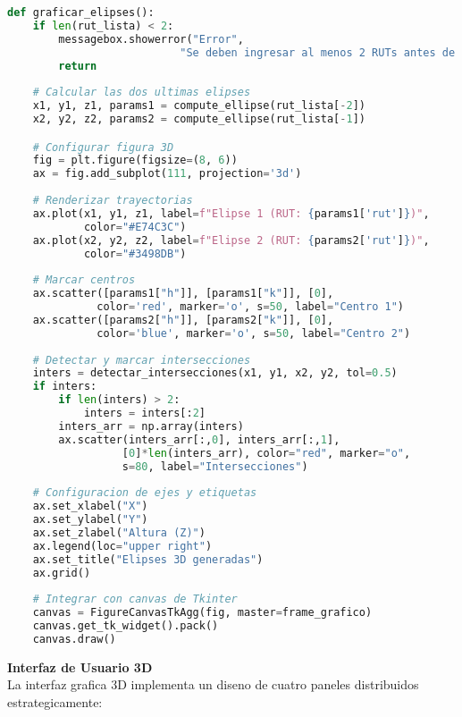 \documentclass[12pt,a4paper]{article}
\begin{document}
\begin{lstlisting}[language=Python, caption=Configuracion del renderizado 3D]
def graficar_elipses():
    if len(rut_lista) < 2:
        messagebox.showerror("Error", 
                           "Se deben ingresar al menos 2 RUTs antes de graficar")
        return
    
    # Calcular las dos ultimas elipses
    x1, y1, z1, params1 = compute_ellipse(rut_lista[-2])
    x2, y2, z2, params2 = compute_ellipse(rut_lista[-1])

    # Configurar figura 3D
    fig = plt.figure(figsize=(8, 6))
    ax = fig.add_subplot(111, projection='3d')
    
    # Renderizar trayectorias
    ax.plot(x1, y1, z1, label=f"Elipse 1 (RUT: {params1['rut']})", 
            color="#E74C3C")
    ax.plot(x2, y2, z2, label=f"Elipse 2 (RUT: {params2['rut']})", 
            color="#3498DB")
    
    # Marcar centros
    ax.scatter([params1["h"]], [params1["k"]], [0], 
              color='red', marker='o', s=50, label="Centro 1")
    ax.scatter([params2["h"]], [params2["k"]], [0], 
              color='blue', marker='o', s=50, label="Centro 2")
    
    # Detectar y marcar intersecciones
    inters = detectar_intersecciones(x1, y1, x2, y2, tol=0.5)
    if inters:
        if len(inters) > 2:
            inters = inters[:2]
        inters_arr = np.array(inters)
        ax.scatter(inters_arr[:,0], inters_arr[:,1], 
                  [0]*len(inters_arr), color="red", marker="o", 
                  s=80, label="Intersecciones")
    
    # Configuracion de ejes y etiquetas
    ax.set_xlabel("X")
    ax.set_ylabel("Y")
    ax.set_zlabel("Altura (Z)")
    ax.legend(loc="upper right")
    ax.set_title("Elipses 3D generadas")
    ax.grid()
    
    # Integrar con canvas de Tkinter
    canvas = FigureCanvasTkAgg(fig, master=frame_grafico)
    canvas.get_tk_widget().pack()
    canvas.draw()
\end{lstlisting}

\textbf{Interfaz de Usuario 3D}\\

La interfaz grafica 3D implementa un diseno de cuatro paneles distribuidos estrategicamente:
\end{document}
